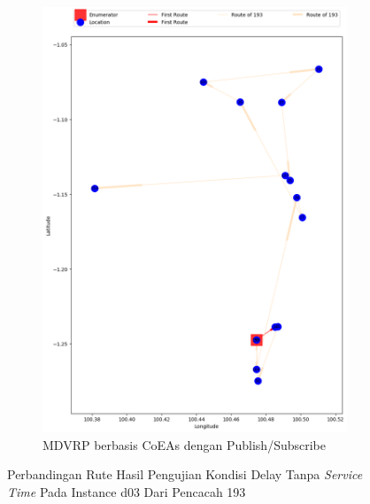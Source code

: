 \begin{figure}[H]\ContinuedFloat
	\centering
	\begin{subfigure}[t]{\textwidth}
		\centering
		\includegraphics[width=\textwidth]{Resources/Images/delayed_3/real_m15_n100_delayed_3_193_pubsub_coes}
		\caption{MDVRP berbasis CoEAs dengan Publish/Subscribe}
		\label{fig:real_m15_n100_delayed_3_193_pubsub_coes}
	\end{subfigure}
	\caption{Perbandingan Rute Hasil Pengujian Kondisi Delay Tanpa \textit{Service Time} Pada Instance d03 Dari Pencacah 193}
	\label{fig:real_m15_n100_delayed_3_193_contd}
\end{figure}


